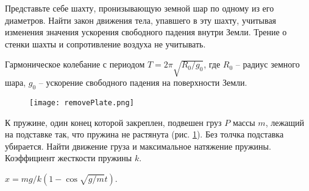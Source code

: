 \complexProblems

\begin{ex} %
Представьте себе шахту, пронизывающую земной шар по одному из его диаметров. Найти закон движения тела, упавшего в эту шахту, учитывая изменения значения ускорения свободного падения внутри Земли. Трение о стенки шахты и сопротивление воздуха не учитывать.
\begin{ans}
Гармоническое колебание с периодом $T = 2 \pi \sqrt{R_0 / g_0}$, где $R_0$ -- радиус земного шара, $g_0$ -- ускорение свободного падения на поверхности Земли.
\end{ans}
\end{ex}	

\begin{figure}[h]
\centering
\texttt{[image: removePlate.png]}
\caption{}
\label{removePlate}
\end{figure}

\begin{ex} %
К пружине, один конец которой закреплен, подвешен груз $P$ массы $m$, лежащий на подставке так, что пружина не растянута (рис. \ref{removePlate}). Без толчка подставка убирается. Найти движение груза и максимальное натяжение пружины. Коэффициент жесткости пружины $k$.
\begin{ans}
$x = mg/k(1-\cos \sqrt{g/m} t)$.
\end{ans}
\end{ex}	

\clearpage